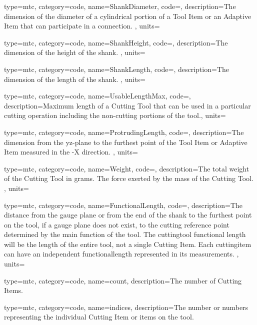 {
  type=mtc,
  category=code,
  name={ShankDiameter},
  code=,
  description={The dimension of the diameter of a cylindrical portion of a Tool Item or an Adaptive Item that can participate in a connection. },
  units=
}


{
  type=mtc,
  category=code,
  name={ShankHeight},
  code=,
  description={The dimension of the height of the shank. },
  units=
}


{
  type=mtc,
  category=code,
  name={ShankLength},
  code=,
  description={The dimension of the length of the shank. },
  units=
}


{
  type=mtc,
  category=code,
  name={UsableLengthMax},
  code=,
  description={Maximum length of a Cutting Tool that can be used in a particular cutting operation including the non-cutting portions of the tool.},
  units=
}


{
  type=mtc,
  category=code,
  name={ProtrudingLength},
  code=,
  description={The dimension from the yz-plane to the furthest point of the Tool Item or Adaptive Item measured in the -X direction. },
  units=
}


{
  type=mtc,
  category=code,
  name={Weight},
  code=,
  description={The total weight of the Cutting Tool in grams. The force exerted by the mass of the Cutting Tool. },
  units=
}


{
  type=mtc,
  category=code,
  name={FunctionalLength},
  code=,
  description={The distance from the gauge plane or from the end of the shank to the furthest point on the tool, if a gauge plane does not exist, to the cutting reference point determined by the main function of the tool. The \gls{cuttingtool} functional length will be the length of the entire tool, not a single Cutting Item. Each \gls{cuttingitem} can have an independent \gls{functionallength} represented in its measurements. },
  units=
}


{
  type=mtc,
  category=code,
  name={count},
  description={The number of Cutting Items. }
}


{
  type=mtc,
  category=code,
  name={indices},
  description={The number or numbers representing the individual Cutting Item or items on the tool. }
}


